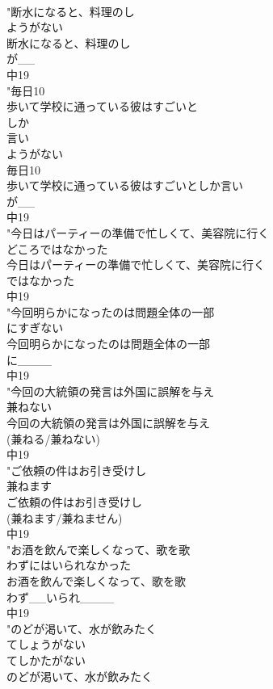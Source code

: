 \documentclass[8pt]{extreport}
\begin{document}
\begin{CJK}{UTF8}{min}
\\	"断水になると、料理のし
\\	ようがない
\\	断水になると、料理のし
\\	が__
\\	中19
\\	"毎日10
\\	歩いて学校に通っている彼はすごいと
\\	しか
\\	言い
\\	ようがない
\\	毎日10
\\	歩いて学校に通っている彼はすごいとしか言い
\\	が__
\\	中19
\\	"今日はパーティーの準備で忙しくて、美容院に行く
\\	どころではなかった
\\	今日はパーティーの準備で忙しくて、美容院に行く
\\	ではなかった
\\	中19
\\	"今回明らかになったのは問題全体の一部
\\	にすぎない
\\	今回明らかになったのは問題全体の一部
\\	に____
\\	中19
\\	"今回の大統領の発言は外国に誤解を与え
\\	兼ねない
\\	今回の大統領の発言は外国に誤解を与え
\\	(兼ねる/兼ねない)
\\	中19
\\	"ご依頼の件はお引き受けし
\\	兼ねます
\\	ご依頼の件はお引き受けし
\\	(兼ねます/兼ねません)
\\	中19
\\	"お酒を飲んで楽しくなって、歌を歌
\\	わずにはいられなかった
\\	お酒を飲んで楽しくなって、歌を歌
\\	わず__いられ____
\\	中19
\\	"のどが渇いて、水が飲みたく
\\	てしょうがない
\\	てしかたがない
\\	のどが渇いて、水が飲みたく

\end{CJK}
\end{document}
